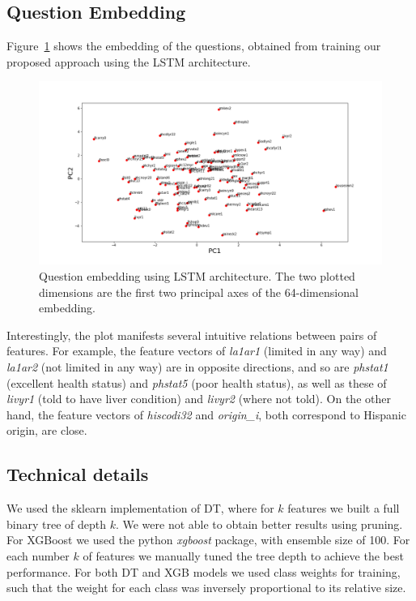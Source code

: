 \documentclass[reqno,11pt]{article}
\begin{document}
\subsection{Question Embedding}
Figure~\ref{fig:embedding} shows the embedding of the questions, obtained from training our proposed approach using the LSTM architecture.
\begin{figure}[t]
  \centering
   \includegraphics[width=1.0\textwidth]{question_embeddings.png}  
    \caption{Question embedding using LSTM architecture. The two plotted dimensions are the first two principal axes of the 64-dimensional embedding.}
    \label{fig:embedding}
\end{figure}
Interestingly, the plot manifests several intuitive relations between pairs of features. For example, the feature vectors of \textit{la1ar1} (limited in any way) and \textit{la1ar2} (not limited in any way) are in opposite directions, and so are \textit{phstat1} (excellent health status) and  \textit{phstat5} (poor health status), as well as these of \textit{livyr1} (told to have liver condition)  and \textit{livyr2} (where not told).
On the other hand, the feature vectors of  \textit{hiscodi32} and \textit{origin\_i}, both correspond to Hispanic origin, are close.

\subsection{Technical details}
We used the sklearn implementation of DT, where for $k$ features we built a full binary tree of depth $k$. We were not able to obtain better results using pruning.
For XGBoost we used the python \textit{xgboost} package, with ensemble size of 100. For each number $k$ of features we manually tuned the tree depth to achieve the best performance.
For both DT and XGB models we used class weights for training, such that the weight for each class was inversely proportional to its relative size.
\end{document}
